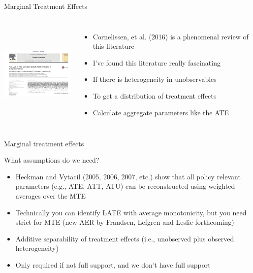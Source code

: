 \documentclass{beamer}
\begin{document}
\begin{frame}{Marginal Treatment Effects}
       \begin{columns}
             \centering
             \includegraphics[height=5.25cm, width=4.5cm]{./lecture_includes/labour_mte.png}
		\begin{itemize}
	\item Cornelissen, et al. (2016) is a phenomenal review of this literature
	\item I've found this literature really fascinating
	\item If there is heterogeneity in unobservables
	\item To get a distribution of treatment effects
	\item Calculate aggregate parameters like the ATE
		\end{itemize}
         \end{columns} 
    \end{frame}





\begin{frame}{Marginal treatment effects}

What assumptions do we need? 
    	\begin{itemize}
	\item Heckman and Vytacil (2005, 2006, 2007, etc.) show that all policy relevant parameters (e.g., ATE, ATT, ATU) can be reconstructed using weighted averages over the MTE
   	\item Technically you can identify LATE with average monotonicity, but you need strict for MTE (new AER by Frandsen, Lefgren and Leslie forthcoming)
    	\item Additive separability of treatment effects (i.e., unobserved plus observed heterogeneity)
    	\item Only required if not full support, and we don't have full support
	\end{itemize}

\end{frame}
\end{document}
